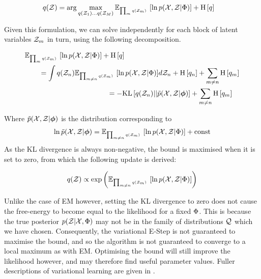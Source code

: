 \begin{align}
q({ \mathcal{Z} }) & = \arg \max_{q({ \mathcal{Z} }_1) \ldots q({ \mathcal{Z} }_M)} { \mathbb{E}_{ { {{ \mbox{\tiny ${\prod_m q({ \mathcal{Z} }_m)}$ } }} } }\left[ { \ln { p( { \mathcal{X} } ,  { \mathcal{Z} } |  { \Phi } ) } } \right] } + \text{H} \left[ q \right]
\end{align}

Given this formulation, we can solve independently for each block of latent variables ${ \mathcal{Z} }_m$ in turn, using the following decomposition.

\begin{align}
\begin{split}
& \mathbb{E}_{{ \mbox{\tiny ${\prod_m q({ \mathcal{Z} }_m)}$ } }} \left[ { \ln { p( { \mathcal{X} } ,  { \mathcal{Z} } |  { \Phi } ) } } \right] + \text{H} \left[ q \right] \\
& \qquad = \int q({ \mathcal{Z} }_n) { \mathbb{E}_{ { {{ \mbox{\tiny ${\prod_{m\neq n} q({ \mathcal{Z} }_m)}$ } }} } }\left[ { \ln { p( { \mathcal{X} } ,  { \mathcal{Z} } |  { \Phi } ) } } \right] } d{ \mathcal{Z} }_n + \text{H} \left[ q_n \right] + \sum_{m\neq n} \text{H} \left[ q_m \right]
\end{split}\\
\begin{split}
& \qquad = -\text{KL}\left[q({ \mathcal{Z} }_n)||\tilde{p}({ \mathcal{X} }, { \mathcal{Z} }|{ \bm \phi })\right] + \sum_{m\neq n} \text{H} \left[ q_m \right] 
\end{split}
\end{align}

Where $\tilde{p}({ \mathcal{X} }, { \mathcal{Z} }|{ \bm \phi })$ is the distribution corresponding to
\begin{align}
\ln \tilde{p}({ \mathcal{X} }, { \mathcal{Z} }|{ \bm \phi }) = \mathbb{E}_{ { { \mbox{\tiny ${\prod_{m\neq n} q({ \mathcal{Z} }_m)}$ } } } }\left[ { \ln { p( { \mathcal{X} } ,  { \mathcal{Z} } |  { \Phi } ) } } \right] + \text{const}
\end{align}
As the KL divergence is always non-negative, the bound is maximised when it is set to zero, from which the following update is derived: 

\begin{align}
q({ \mathcal{Z} }) \propto \exp\left( { \mathbb{E}_{ { {{ \mbox{\tiny ${\prod_{m\neq n} q({ \mathcal{Z} }_m)}$ } }} } }\left[ { \ln { p( { \mathcal{X} } ,  { \mathcal{Z} } |  { \Phi } ) } } \right] }  \right)
\end{align}

Unlike the case of EM however, setting the KL divergence to zero does not cause the free-energy to become equal to the likelihood for a fixed ${ \Phi }$. This is because the true posterior $p({ \mathcal{Z} } | { \mathcal{X} }, { \Phi })$ may not be in the family of distributions ${ \mathcal{Q} }$ which we have chosen. Consequently, the variational E-Step is not guaranteed to maximise the bound, and so the algorithm is not guaranteed to converge to a local maximum as with EM. Optimising the bound will still improve the likelihood however, and may therefore find useful parameter values. Fuller descriptions of variational learning are given in \cite{Jordan1999a}\cite{Bishop2006}\cite{Tzikas2008}. 



